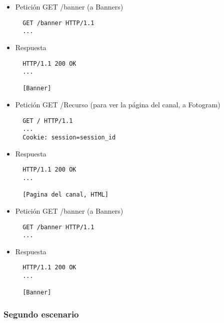 \begin{itemize}
\begin{verbatim}
  [Pagina principal, ya con enlace al canal recién creado, HTML]
\end{verbatim}

La cookie que se envió anteriormente, en realidad se podría enviar aquí, pues hasta este momento no hay nada que asociar a la sesión.

\item Petición GET /banner (a Banners)

\begin{verbatim}
  GET /banner HTTP/1.1
  ...
\end{verbatim}

\item Respuesta

\begin{verbatim}
  HTTP/1.1 200 OK
  ...

  [Banner]
\end{verbatim}

\item Petición GET /Recurso (para ver la página del canal, a Fotogram)

\begin{verbatim}
  GET / HTTP/1.1
  ...
  Cookie: session=session_id
\end{verbatim}

\item Respuesta

\begin{verbatim}
  HTTP/1.1 200 OK
  ...

  [Pagina del canal, HTML]
\end{verbatim}

\item Petición GET /banner (a Banners)

\begin{verbatim}
  GET /banner HTTP/1.1
  ...
\end{verbatim}

\item Respuesta

\begin{verbatim}
  HTTP/1.1 200 OK
  ...

  [Banner]
\end{verbatim}

\end{itemize}

\subsubsection*{Segundo escenario}

